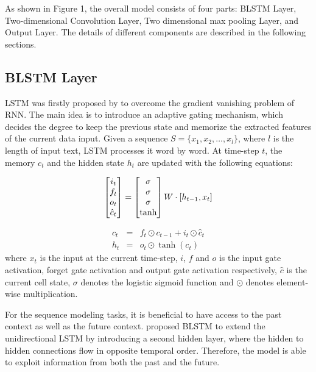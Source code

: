 \documentclass[11pt]{article}
\begin{document}
As shown in Figure 1, the overall model consists of four parts: BLSTM Layer, Two-dimensional Convolution Layer, Two dimensional max pooling Layer, and Output Layer. The details of different components are described in the following sections.
\subsection{BLSTM Layer}

LSTM was firstly proposed by  to overcome the gradient vanishing problem of RNN. The main idea is to introduce an adaptive gating mechanism, which decides the degree to keep the previous state and memorize the extracted features of the current data input. 
Given a sequence $S =\{x_1, x_2, \dots, x_l\}$, where $l$ is the length of input text, LSTM processes it word by word. At time-step $t$, the memory $c_t$ and the hidden state $h_t$ are updated with the following equations:


\begin{equation}
\begin{bmatrix}
i_t\\f_t\\o_t\\\hat{c}_t
\end{bmatrix}
 = 
\begin{bmatrix}
\sigma\\ \sigma\\ \sigma\\ \tanh
\end{bmatrix}
W\cdot \lbrack h_{t-1}, x_t \rbrack\\
\end{equation}

\begin{eqnarray}
c_t & = & f_t \odot c_{t-1} + i_t \odot \hat{c}_t\\
h_t & = & o_t \odot \tanh(c_t)
\end{eqnarray}
where $x_t$ is the input at the current time-step, $i$, $f$ and $o$ is the input gate activation, forget gate activation and output gate activation respectively, $\hat{c}$ is the current cell state, $\sigma$ denotes the logistic sigmoid function and $\odot$ denotes element-wise multiplication.

For the sequence modeling tasks, it is beneficial to have access to the past context as well as the future context.  proposed BLSTM to extend the unidirectional LSTM by introducing a second hidden layer, where the hidden to hidden connections flow in opposite temporal order. Therefore, the model is able to exploit information from both the past and the future.
\end{document}
